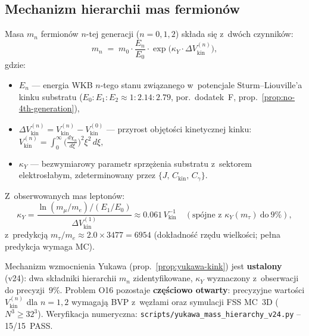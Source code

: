 \subsection{Mechanizm hierarchii mas ferm\-ion\'ow}\label{ssec:yukawa-kink}

\begin{proposition}\label{prop:yukawa-kink}
Masa $m_n$ fermion\'ow $n$-tej generacji ($n=0,1,2$) sk\l{}ada si\k{e}
z~dw\'och czynnik\'ow:
\begin{equation}\label{eq:yukawa-kink}
  m_n \;=\; m_0 \cdot \frac{E_n}{E_0}
        \cdot \exp\!\bigl(\kappa_Y \cdot \Delta V_{\mathrm{kin}}^{(n)}\bigr),
\end{equation}
gdzie:
\begin{itemize}[nosep]
  \item $E_n$ --- energia WKB $n$-tego stanu zwi\k{a}zanego w~potencjale
    Sturm--Liouville'a kinku substratu
    ($E_0{:}E_1{:}E_2 \approx 1{:}2.14{:}2.79$, por.\
    dodatek~F, prop.~\ref{prop:no-4th-generation}),
  \item $\Delta V_{\mathrm{kin}}^{(n)}
         = V_{\mathrm{kin}}^{(n)} - V_{\mathrm{kin}}^{(0)}$
    --- przyrost obj\k{e}to\'sci kinetycznej kinku:
    \(
      V_{\mathrm{kin}}^{(n)}
      = \int_0^\infty \!\bigl(\tfrac{d\chi_n}{d\xi}\bigr)^2\xi^2\,d\xi,
    \)
  \item $\kappa_Y$ --- bezwymiarowy parametr sprzężenia substratu
    z~sektorem elektros\l{}abym, zdeterminowany przez
    $\{J,\,C_{\mathrm{kin}},\,C_\gamma\}$.
\end{itemize}
Z~obserwowanych mas lepton\'ow:
\begin{equation}\label{eq:kappaY}
  \kappa_Y = \frac{\ln(m_\mu/m_e)/(E_1/E_0)}{\Delta V_{\mathrm{kin}}^{(1)}}
           \approx 0.061\,V_{\mathrm{kin}}^{-1}
           \quad (\text{spójne z~}\kappa_Y(m_\tau)\ \text{do}\ 9\%),
\end{equation}
z~predykcją $m_\tau/m_e \approx 2.0 \times 3477 = 6954$
(dok\l{}adno\'s\'c rzędu wielkości; pełna predykcja wymaga MC).
\end{proposition}

\begin{remark}[Status O16 -- v24]\label{rem:O16-v24}
Mechanizm wzmocnienia Yukawa (prop.~\ref{prop:yukawa-kink}) jest
\textbf{ustalony} (v24): dwa sk\l{}adniki hierarchii $m_n$ zidentyfikowane,
$\kappa_Y$ wyznaczony z~obserwacji do precyzji~$9\%$. Problem O16
pozostaje \textbf{cz\k{e}\'sciowo otwarty}: precyzyjne wartości
$V_{\mathrm{kin}}^{(n)}$ dla $n=1,2$ wymagaj\k{a} BVP z~w\k{e}z\l{}ami
oraz symulacji FSS MC~3D ($N^3 \geq 32^3$).
Weryfikacja numeryczna: \texttt{scripts/yukawa\_mass\_hierarchy\_v24.py}
-- 15/15~PASS\@.
\end{remark}





